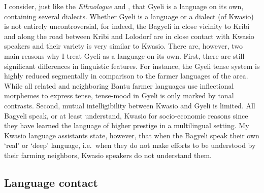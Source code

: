 I consider, just like the \textit{Ethnologue} and \citet{maho2009}, that Gyeli is a language on its own, containing several dialects. Whether Gyeli is a language or a dialect (of Kwasio) is not entirely uncontroversial, for indeed, the Bagyeli in close vicinity to Kribi and along the road between Kribi and Lolodorf are in close contact with Kwasio speakers and their variety is very similar to Kwasio. There are, however, two main reasons why I treat Gyeli as a language on its own. First, there are still significant differences in linguistic features. For instance, the Gyeli tense system is highly reduced segmentally in comparison to the farmer languages of the area. While all related and neighboring Bantu farmer languages use inflectional morphemes to express tense, tense-mood in Gyeli is only marked by tonal contrasts.
 Second, mutual intelligibility between Kwasio and Gyeli is limited. All Bagyeli speak, or at least understand, Kwasio for socio-economic reasons since they have learned the language of higher prestige in a multilingual setting.  My Kwasio language assistants state, however, that when the Bagyeli speak their own `real' or `deep' language, i.e.\ when they do not make efforts to be understood by their farming neighbors, Kwasio speakers do not understand them.



\subsection{Language contact}
\label{sec:LangCon}



